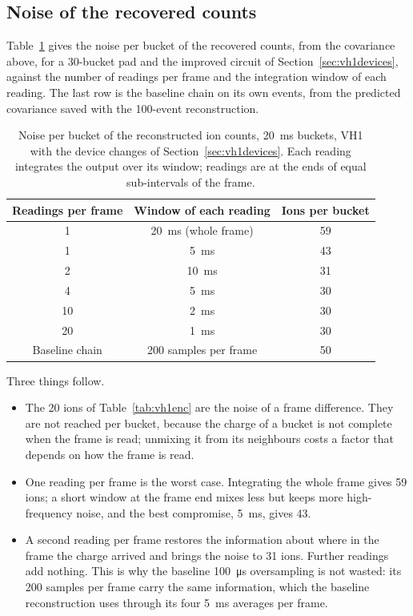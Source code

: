 \documentclass[11pt,a4paper]{article}
\begin{document}
\subsection{Noise of the recovered counts}
\label{sec:vh1result}
%
Table~\ref{tab:vh1readings} gives the noise per bucket of the recovered
counts, from the covariance above, for a 30-bucket pad and the improved
circuit of Section~\ref{sec:vh1devices}, against the number of readings per
frame and the integration window of each reading. The last row is the
baseline chain on its own events, from the predicted covariance saved with
the 100-event reconstruction.
%
\begin{table}[htbp]\centering
\caption{Noise per bucket of the reconstructed ion counts, \SI{20}{ms}
buckets, VH1 with the device changes of Section~\ref{sec:vh1devices}. Each
reading integrates the output over its window; readings are at the ends of
equal sub-intervals of the frame.}
\begin{tabular}{ccc}
\toprule
Readings per frame & Window of each reading & Ions per bucket\\
\midrule
1 & \SI{20}{ms} (whole frame) & 59\\
1 & \SI{5}{ms} & 43\\
2 & \SI{10}{ms} & 31\\
4 & \SI{5}{ms} & 30\\
10 & \SI{2}{ms} & 30\\
20 & \SI{1}{ms} & 30\\
\midrule
Baseline chain & 200 samples per frame & 50\\
\bottomrule
\end{tabular}
\label{tab:vh1readings}
\end{table}
%
Three things follow.
%
\begin{itemize}
\item The \SI{20}{} ions of Table~\ref{tab:vh1enc} are the noise of a frame
  difference. They are not reached per bucket, because the charge of a
  bucket is not complete when the frame is read; unmixing it from its
  neighbours costs a factor that depends on how the frame is read.
\item One reading per frame is the worst case. Integrating the whole frame
  gives \SI{59}{} ions; a short window at the frame end mixes less but keeps
  more high-frequency noise, and the best compromise, \SI{5}{ms}, gives
  \SI{43}{}.
\item A second reading per frame restores the information about where in
  the frame the charge arrived and brings the noise to \SI{31}{} ions.
  Further readings add nothing. This is why the baseline \SI{100}{\micro s}
  oversampling is not wasted: its 200 samples per frame carry the same
  information, which the baseline reconstruction uses through its four
  \SI{5}{ms} averages per frame.
\end{itemize}
\end{document}
